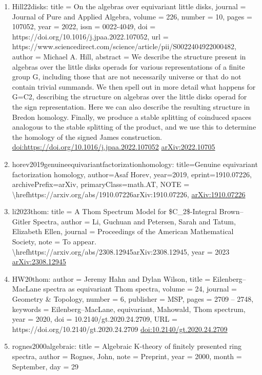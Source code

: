 \documentclass[11pt]{article}
\begin{document}
\begin{enumerate}[leftmargin=*]
  \item Hill22disks: title = On the algebras over equivariant little disks, journal = Journal of Pure and Applied Algebra, volume = 226, number = 10, pages = 107052, year = 2022, issn = 0022-4049, doi = https://doi.org/10.1016/j.jpaa.2022.107052, url = https://www.sciencedirect.com/science/article/pii/S0022404922000482, author = Michael A. Hill, abstract = We describe the structure present in algebras over the little disks operads for various representations of a finite group G, including those that are not necessarily universe or that do not contain trivial summands. We then spell out in more detail what happens for G=C2, describing the structure on algebras over the little disks operad for the sign representation. Here we can also describe the resulting structure in Bredon homology. Finally, we produce a stable splitting of coinduced spaces analogous to the stable splitting of the product, and we use this to determine the homology of the signed James construction. \href{https://doi.org/https://doi.org/10.1016/j.jpaa.2022.107052}{doi:https://doi.org/10.1016/j.jpaa.2022.107052} \href{https://arxiv.org/abs/2022.10705}{arXiv:2022.10705}
  \item horev2019genuineequivariantfactorizationhomology: title=Genuine equivariant factorization homology, author=Asaf Horev, year=2019, eprint=1910.07226, archivePrefix=arXiv, primaryClass=math.AT, NOTE = \textbackslash{}hrefhttps://arxiv.org/abs/1910.07226arXiv:1910.07226, \href{https://arxiv.org/abs/1910.07226}{arXiv:1910.07226}
  \item li2023thom: title = A Thom Spectrum Model for \$C\_2\$-Integral Brown--Gitler Spectra, author = Li, Guchuan and Petersen, Sarah and Tatum, Elizabeth Ellen, journal = Proceedings of the American Mathematical Society, note = To appear. \textbackslash{}hrefhttps://arxiv.org/abs/2308.12945arXiv:2308.12945, year = 2023 \href{https://arxiv.org/abs/2308.12945}{arXiv:2308.12945}
  \item HW20thom: author = Jeremy Hahn and Dylan Wilson, title = Eilenberg--MacLane spectra as equivariant Thom spectra, volume = 24, journal = Geometry \& Topology, number = 6, publisher = MSP, pages = 2709 -- 2748, keywords = Eilenberg--MacLane, equivariant, Mahowald, Thom spectrum, year = 2020, doi = 10.2140/gt.2020.24.2709, URL = https://doi.org/10.2140/gt.2020.24.2709 \href{https://doi.org/10.2140/gt.2020.24.2709}{doi:10.2140/gt.2020.24.2709}
  \item rognes2000algebraic: title = Algebraic K-theory of finitely presented ring spectra, author = Rognes, John, note = Preprint, year = 2000, month = September, day = 29

\end{enumerate}
\end{document}
